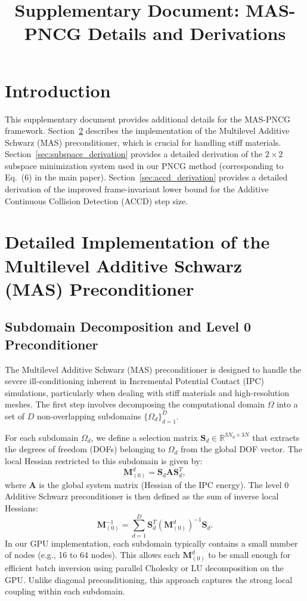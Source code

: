 \documentclass[acmtog,anonymous,review,screen,nonacm]{acmart}
\begin{document}
\title[Supplementary Document]{Supplementary Document: MAS-PNCG Details and Derivations}

\maketitle

\section{Introduction}
This supplementary document provides additional details for the MAS-PNCG framework. Section~\ref{sec:mas_details} describes the implementation of the Multilevel Additive Schwarz (MAS) preconditioner, which is crucial for handling stiff materials. Section~\ref{sec:subspace_derivation} provides a detailed derivation of the $2 \times 2$ subspace minimization system used in our PNCG method (corresponding to Eq.~(6) in the main paper). Section~\ref{sec:accd_derivation} provides a detailed derivation of the improved frame-invariant lower bound for the Additive Continuous Collision Detection (ACCD) step size.

\section{Detailed Implementation of the Multilevel Additive Schwarz (MAS) Preconditioner}
\label{sec:mas_details}

\subsection{Subdomain Decomposition and Level 0 Preconditioner}
The Multilevel Additive Schwarz (MAS) preconditioner is designed to handle the severe ill-conditioning inherent in Incremental Potential Contact (IPC) simulations, particularly when dealing with stiff materials and high-resolution meshes. The first step involves decomposing the computational domain $\Omega$ into a set of $D$ non-overlapping subdomains $\{\Omega_d\}_{d=1}^D$. 

For each subdomain $\Omega_d$, we define a selection matrix $\mathbf{S}_d \in \mathbb{R}^{3 N_d \times 3 N}$ that extracts the degrees of freedom (DOFs) belonging to $\Omega_d$ from the global DOF vector. The local Hessian restricted to this subdomain is given by:
\begin{equation}
    \mathbf{M}_{(0)}^d = \mathbf{S}_d \mathbf{A} \mathbf{S}_d^T,
\end{equation}
where $\mathbf{A}$ is the global system matrix (Hessian of the IPC energy). The level 0 Additive Schwarz preconditioner is then defined as the sum of inverse local Hessians:
\begin{equation}
    \mathbf{M}_{(0)}^{-1} = \sum_{d=1}^D \mathbf{S}_d^T (\mathbf{M}_{(0)}^d)^{-1} \mathbf{S}_d.
\end{equation}
In our GPU implementation, each subdomain typically contains a small number of nodes (e.g., 16 to 64 nodes). This allows each $\mathbf{M}_{(0)}^d$ to be small enough for efficient batch inversion using parallel Cholesky or LU decomposition on the GPU. Unlike diagonal preconditioning, this approach captures the strong local coupling within each subdomain.
\end{document}
